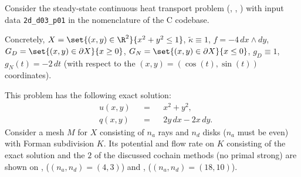 \begin{example}
  \label{cmc/diffusion/continuous/steady_state/examples/2d_d03_p01-example}
  Consider the steady-state continuous heat transport problem
  (,
   ,
   )
  with input data \verb|2d_d03_p01| in the nomenclature of the C codebase.

  Concretely,
    $X = \set{(x, y) \in \R^2}{x^2 + y^2 \leq 1}$,
    $\tilde{\kappa} \equiv 1$,
    $f = - 4 \, d x \wedge d y$,
    $G_D = \set{(x, y) \in \partial X}{x \geq 0}$,
    $G_N = \set{(x, y) \in \partial X}{x \leq 0}$,
    $g_D \equiv 1$,
    $g_N(t) = - 2 \, d t$
    (with respect to the $(x, y) = (\cos(t), \sin(t))$ coordinates).

  This problem has the following exact solution:
  \begin{subequations}
    \begin{alignat}{3}
      & u(x, y) && = && x^2 + y^2, \\
      & q(x, y) && = && 2 y \, d x - 2 x \, d y.
    \end{alignat}
  \end{subequations}
  Consider a mesh $M$ for $X$ consisting of $n_a$ rays and $n_d$ disks
  ($n_a$ must be even) with Forman subdivision $K$.
  Its potential and flow rate on $K$ consisting of the exact solution and the
  $2$ of the discussed cochain methods (no primal strong) are shown on
  ,
  ($(n_a, n_d) = (4, 3)$)
  and
  ,
  ($(n_a, n_d) = (18, 10)$).
\end{example}
